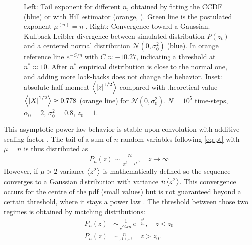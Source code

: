 \documentclass[FinalReport.tex]{subfiles}
\begin{document}
\begin{figure}[h!]
	\centering
	\caption{Left: Tail exponent for different $n$, obtained by fitting the CCDF (blue) or with Hill estimator (orange, \cite{Hill75}). Green line is the postulated exponent $\mu^{(n)}=n$ \cite{OptCont,FrontNanoScience}.
	Right: Convergence toward a Gaussian. Kullback-Leibler divergence between simulated distribution $P(z_t)$ and a centered normal distribution $\mathcal{N}(0,\sigma_0^2)$ (blue). In orange reference line $e^{-C/n}$ with $C\approx-10.27$, indicating a threshold at $n^*\approx 10$. After $n^*$ empirical distribution is close to the normal one, and adding more look-backs does not change the behavior. Inset: absolute half moment $\expval{\abs{z}^{1/2}}$ compared with theoretical value $\expval{\abs{X}^{1/2}} \approx0.778$ (orange line) for $\mathcal{N}(0,\sigma_0^2)$. $N=10^5$ time-steps, $\alpha_0=2$, $\sigma_0^2=0.8$, $z_0=1$.}
	\label{fig:KL_n}
\end{figure} 


This asymptotic power law behavior is stable upon convolution with additive scaling factor \cite[chap.~4]{CritPhenom}. The tail of a sum of $n$ random variables following \eqref{eq:pt} with $\mu=n$ is thus distributed as  
\begin{equation}
	P_n(z)\sim \frac{n}{z^{1+\mu}}, \quad z\rightarrow\infty	
\end{equation}
However, if $\mu>2$ variance $\expval{z^2}$ is mathematically defined so the sequence converges to a Gaussian distribution with variance $n\expval{z^2}$. This convergence occurs for the centre of the pdf (small values) but is not guaranteed beyond a certain threshold, where it stays a power law \cite[chap.~3]{CritPhenom}. The threshold between those two regimes is obtained by matching distributions:
\begin{subequations}\label{eq:z0}
	\begin{align}
	P_n(z)&\sim \frac{1}{\sqrt{2\pi n}}e^{-\frac{z^2}{2n}}, \quad z<z_0\\
	P_n(z)&\sim \frac{n}{z^{1+\mu}}, \quad z>z_0.
	\end{align}
\end{subequations}
\end{document}
